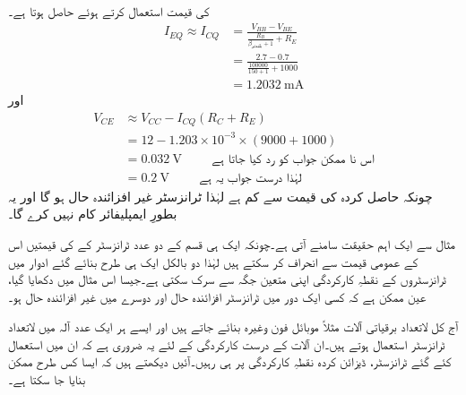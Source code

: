 \begin{enumerate}
	 کی قیمت استعمال کرتے ہوئے حاصل ہوتا ہے۔
\begin{align*}
I_{EQ} \approx I_{CQ} &=\frac{V_{BB}-V_{BE}}{\frac{R_B}{\beta_{\textrm{بلندتر}}+1}+R_E}\\
&=\frac{2.7-0.7}{\frac{100000}{150+1}+1000}\\
&=\SI{1.2032}{\milli \ampere}
\end{align*}
اور
\begin{align*}
V_{CE} & \approx V_{CC}-I_{CQ} \left (R_C+R_E \right )\\ 
&=12-1.203 \times 10^{-3} \times \left (9000+1000 \right )\\
&=\SI{0.032}{\volt} \hspace{1cm} \textrm{اس نا ممکن جواب کو رد کیا جاتا ہے}\\
&=\SI{0.2}{\volt} \hspace{1cm} \textrm{لہٰذا درست جواب یہ ہے}
\end{align*}
	چونکہ حاصل کردہ   کی قیمت  سے کم ہے لہٰذا ٹرانزسٹر غیر افزائندہ حال ہو گا اور یہ بطورِ ایمپلیفائر کام نہیں کرے گا۔ 
\end{enumerate}
	
مثال   سے ایک اہم حقیقت سامنے آتی ہے۔چونکہ ایک ہی قسم کے دو عدد ٹرانزسٹر کے  کی قیمتیں اس کے عمومی قیمت  سے انحراف کر سکتے ہیں لہٰذا دو بالکل ایک ہی طرح بنائے گئے ادوار میں ٹرانزسٹروں کے نقطہِ کارکردگی اپنی متعین جگہ سے سرک سکتی ہے۔جیسا اس مثال میں دکھایا گیا، عین ممکن ہے کہ کسی ایک دور میں ٹرانزسٹر افزائندہ حال اور دوسرے میں غیر افزائندہ حال ہو۔

آج کل لاتعداد برقیاتی آلات مثلاً موبائل فون وغیرہ بنائے جاتے ہیں اور ایسے ہر ایک عدد آلہ میں لاتعداد ٹرانزسٹر استعمال ہوتے ہیں۔ان آلات کے درست کارکردگی کے لئے یہ ضروری ہے کہ ان میں استعمال کئے گئے ٹرانزسٹر، ڈیزائن کردہ نقطہِ کارکردگی پر ہی رہیں۔آئیں دیکھتے ہیں کہ ایسا کس طرح ممکن بنایا جا سکتا ہے۔

